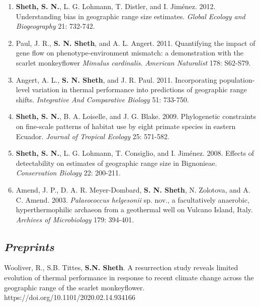 \documentclass[11pt,english]{article}\usepackage[]{graphicx}\usepackage[]{color}
\begin{document}
\begin{hangparas}{.5in}{1}
\begin{enumerate}
\item \textbf{Sheth, S. N.}, L. G. Lohmann, T. Distler, and I. Jim\'enez. 2012. Understanding bias in geographic range size estimates. \emph{Global Ecology and Biogeography} 21: 732-742.
 
 \item Paul, J. R., \textbf{S. N. Sheth}, and A. L. Angert. 2011. Quantifying the impact of gene flow on phenotype-environment mismatch: a demonstration with the scarlet monkeyflower \textit{Mimulus cardinalis}. \emph{American Naturalist} 178: S62-S79. 
 
\item Angert, A. L., \textbf{S. N. Sheth}, and J. R. Paul. 2011. Incorporating population-level variation in thermal performance into predictions of geographic range shifts. \emph{Integrative And Comparative Biology} 51: 733-750. 

\item \textbf{Sheth, S. N.}, B. A. Loiselle, and J. G. Blake. 2009. Phylogenetic constraints on fine-scale patterns of habitat use by eight primate species in eastern Ecuador. \emph{Journal of Tropical Ecology} 25: 571-582. 

\item \textbf{Sheth, S. N.}, L. G. Lohmann, T. Consiglio, and I. Jim\'enez. 2008. Effects of detectability on estimates of geographic range size in Bignonieae. \emph{Conservation Biology} 22: 200-211. 

\item Amend, J. P., D. A. R. Meyer-Dombard, \textbf{S. N. Sheth}, N. Zolotova, and A. C. Amend. 2003. \textit{Palaeococcus helgesonii} sp. nov., a facultatively anaerobic, hyperthermophilic archaeon from a geothermal well on Vulcano Island, Italy. \emph{Archives of Microbiology} 179: 394-401. 
\end{enumerate}
\end{hangparas}

\subsection*{\textit{Preprints}} 

\begin{hangparas}{.5in}{1}

Wooliver, R., S.B. Tittes, \textbf{S.N. Sheth}. A resurrection study reveals limited evolution of thermal performance in response to recent climate change across the geographic range of the scarlet monkeyflower. https://doi.org/10.1101/2020.02.14.934166

\end{hangparas}
\end{document}
